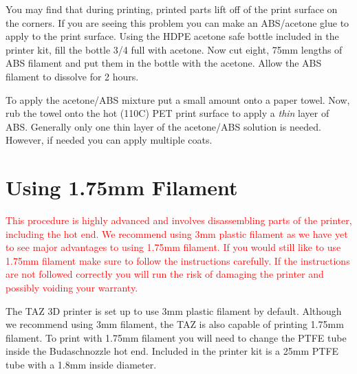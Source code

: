 You may find that during printing, printed parts lift off of the print surface on the corners. If you are seeing this problem you can make an ABS/acetone glue to apply to the print surface. Using the HDPE acetone safe bottle included in the printer kit, fill the bottle 3/4 full with acetone. Now cut eight, 75mm lengths of ABS filament and put them in the bottle with the acetone. Allow the ABS filament to dissolve for 2 hours.

To apply the acetone/ABS mixture put a small amount onto a paper towel. Now, rub the towel onto the hot (110C) PET print surface to apply a \emph{thin} layer of ABS. Generally only one thin layer of the acetone/ABS solution is needed. However, if needed you can apply multiple coats.

\section{Using 1.75mm Filament}
\textcolor{red}{This procedure is highly advanced and involves disassembling parts of the printer, including the hot end. We recommend using 3mm plastic filament as we have yet to see major advantages to using 1.75mm filament. If you would still like to use 1.75mm filament make sure to follow the instructions carefully. If the instructions are not followed correctly you will run the risk of damaging the printer and possibly voiding your warranty.}

The TAZ 3D printer is set up to use 3mm plastic filament by default. Although we recommend using 3mm filament, the TAZ is also capable of printing 1.75mm filament. To print with 1.75mm filament you will need to change the PTFE tube inside the Budaschnozzle hot end. Included in the printer kit is a 25mm PTFE tube with a 1.8mm inside diameter.

